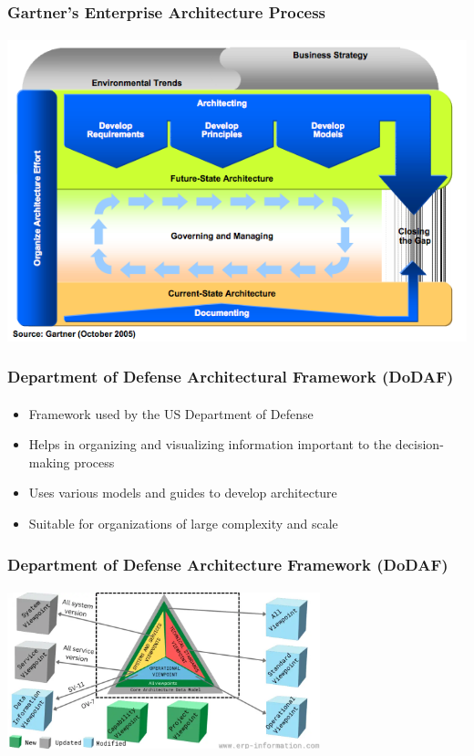 \documentclass[aspectratio=169, table]{beamer}
\begin{document}
    {
        \begin{frame}
            \frametitle{Gartner's Enterprise Architecture Process}
            \framesubtitle{\hspace{1cm}}
            \begin{center}
                \includegraphics[width=.70\textwidth]{../figures/gartner}
            \end{center}
        \end{frame}
    }

    \begin{frame}
        \frametitle{Department of Defense Architectural Framework (DoDAF)}
        \framesubtitle{\hspace{1cm}}
        \begin{itemize}
            \item Framework used by the US Department of Defense
            \item Helps in organizing and visualizing information important to the decision-making process
            \item Uses various models and guides to develop architecture
            \item Suitable for organizations of large complexity and scale
        \end{itemize}
    \end{frame}

    {
        \begin{frame}
            \frametitle{Department of Defense Architecture Framework (DoDAF)}
            \framesubtitle{\hspace{1cm}}
            \begin{center}
                \includegraphics[width=0.68\textwidth]{../figures/dodaf}
            \end{center}
        \end{frame}
    }
\end{document}
